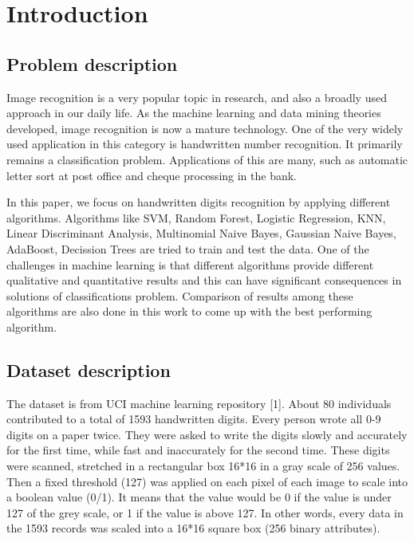 \documentclass[letterpaper,10pt]{article}
\theoremstyle{mytheor}
\begin{document}
\newpage

\section{Introduction}

\subsection{Problem description}

Image recognition is a very popular topic in research, and also a broadly used approach in our daily life. As the machine learning and data mining theories developed, image recognition is now a mature technology. One of the very widely used application in this category is handwritten number recognition. It primarily remains a classification problem. Applications of this  are many, such as automatic letter sort at post office and cheque processing in the bank.

In this paper, we focus on handwritten digits recognition by applying different algorithms. Algorithms like SVM, Random Forest, Logistic Regression, KNN, Linear Discriminant Analysis, Multinomial Naive Bayes, Gaussian Naive Bayes, AdaBoost, Decission Trees are tried to train and test the data. One of the challenges in machine learning is that different algorithms provide different qualitative and quantitative results and this can have significant consequences in solutions of classifications problem. Comparison of results among these algorithms are also done in this work to come up with the best performing algorithm.

\subsection{Dataset description}

The dataset is from UCI machine learning repository [1]. About 80 individuals contributed to a total of 1593 handwritten digits. Every person wrote all 0-9 digits on a paper twice. They were asked to write the digits slowly and accurately for the first time, while fast and inaccurately for the second time. These digits were scanned, stretched in a rectangular box 16*16 in a gray scale of 256 values. Then a fixed threshold (127) was applied on each pixel of each image to scale into a boolean value (0/1). It means that the value would be 0 if the value is under 127 of the grey scale, or 1 if the value is above 127. In other words, every data in the 1593 records was scaled into a 16*16 square box (256 binary attributes).
\end{document}
